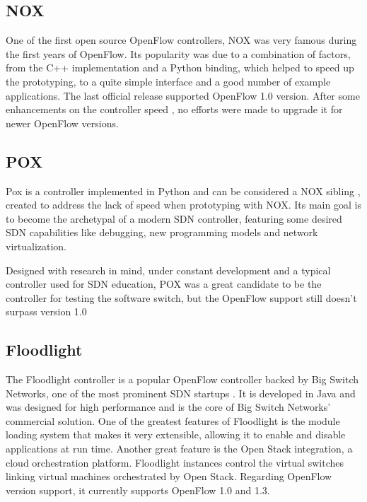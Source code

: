     \subsection{NOX}

    One of the first open source OpenFlow controllers, NOX \cite{nox} was very famous during the first years of OpenFlow. Its popularity was due to a combination of factors, from the C++ implementation and a Python binding, which helped to speed up the prototyping, to a quite simple interface and a good number of example applications. The last official release supported OpenFlow 1.0 version. After some enhancements on the controller speed \cite{nox-mt}, no efforts were made to upgrade it for newer OpenFlow versions. 
    
    \subsection{POX}
    
    Pox is a controller implemented in Python and can be considered a NOX sibling \cite{pox}, created to address the lack of speed when prototyping with NOX. Its main goal is to become the archetypal of a modern SDN controller, featuring some desired SDN capabilities like debugging, new programming models and network virtualization. 
    
    Designed with research in mind, under constant development and a typical controller used for SDN education, POX was a great candidate to be the controller for testing the software switch, but the OpenFlow support still doesn't surpass version 1.0
  
    \subsection{Floodlight}

    The Floodlight controller is a popular OpenFlow controller backed by Big Switch Networks, one of the most prominent SDN startups \cite{floodlight}. It is developed in Java and was designed for high performance and is the core of Big Switch Networks' commercial solution. One of the greatest features of Floodlight is the module loading system that makes it very extensible, allowing it to enable and disable applications at run time. Another great feature is the Open Stack integration, a cloud orchestration platform. Floodlight instances control the virtual switches linking virtual machines orchestrated by Open Stack. Regarding OpenFlow version support, it currently supports OpenFlow 1.0 and 1.3. 
  
